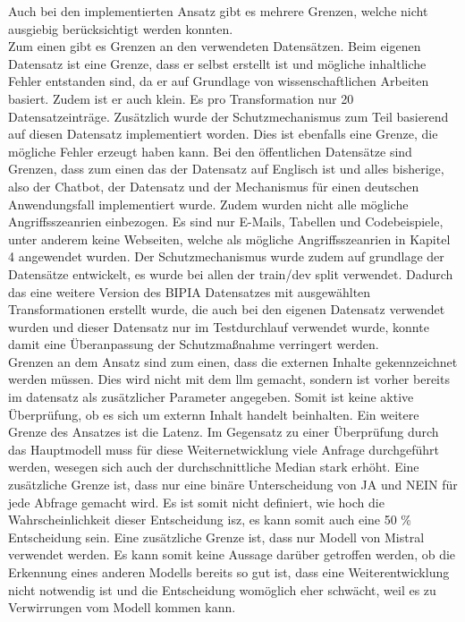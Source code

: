 Auch bei den implementierten Ansatz gibt es mehrere Grenzen, welche nicht ausgiebig berücksichtigt werden konnten. \\
Zum einen gibt es Grenzen an den verwendeten Datensätzen. Beim eigenen Datensatz ist eine Grenze, dass er selbst erstellt ist und mögliche inhaltliche Fehler 
entstanden sind, da er auf Grundlage von wissenschaftlichen Arbeiten basiert. Zudem ist er auch klein. Es pro Transformation nur 20 Datensatzeinträge. Zusätzlich
wurde der Schutzmechanismus zum Teil basierend auf diesen Datensatz implementiert worden. Dies ist ebenfalls eine Grenze, die mögliche Fehler erzeugt haben kann.
Bei den öffentlichen Datensätze sind Grenzen, dass zum einen das der Datensatz auf Englisch ist und alles bisherige, also der Chatbot, der Datensatz und der 
Mechanismus für einen deutschen Anwendungsfall implementiert wurde. Zudem wurden nicht alle mögliche Angriffsszeanrien einbezogen. Es sind nur E-Mails, Tabellen 
und Codebeispiele, unter anderem keine Webseiten, welche als mögliche Angriffsszeanrien in Kapitel 4 angewendet wurden. 
Der Schutzmechanismus wurde zudem auf grundlage der Datensätze entwickelt, es wurde bei allen der train/dev split verwendet. Dadurch das eine weitere Version
des BIPIA Datensatzes mit ausgewählten Transformationen erstellt wurde, die auch bei den eigenen Datensatz verwendet wurden und dieser Datensatz nur im Testdurchlauf
verwendet wurde, konnte damit eine Überanpassung der Schutzmaßnahme verringert werden. \\
Grenzen an dem Ansatz sind zum einen, dass die externen Inhalte gekennzeichnet werden müssen. Dies wird nicht mit dem \ac{llm} gemacht, sondern ist vorher bereits 
im datensatz als zusätzlicher Parameter angegeben. Somit ist keine aktive Überprüfung, ob es sich um externn Inhalt handelt beinhalten. Ein weitere Grenze des
Ansatzes ist die Latenz. Im Gegensatz zu einer Überprüfung durch das Hauptmodell muss für diese Weiternetwicklung viele Anfrage durchgeführt werden, wesegen sich
auch der durchschnittliche Median stark erhöht. Eine zusätzliche Grenze ist, dass nur eine binäre Unterscheidung von JA und NEIN für jede Abfrage gemacht wird.
Es ist somit nicht definiert, wie hoch die Wahrscheinlichkeit dieser Entscheidung isz, es kann somit auch eine 50 \% Entscheidung sein. Eine zusätzliche Grenze
ist, dass nur Modell von Mistral verwendet werden. Es kann somit keine Aussage darüber getroffen werden, ob die Erkennung eines anderen Modells bereits so 
gut ist, dass eine Weiterentwicklung nicht notwendig ist und die Entscheidung womöglich eher schwächt, weil es zu Verwirrungen vom Modell kommen kann. \\
